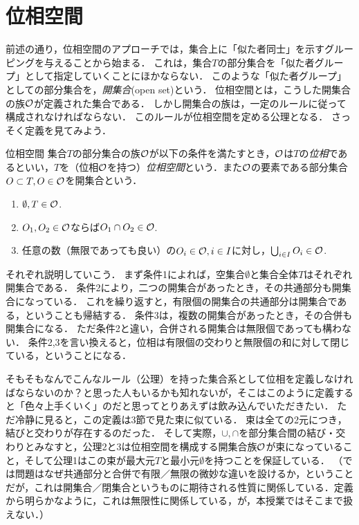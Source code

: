 \documentclass[11pt,a4paper]{jsarticle}
\begin{document}
\section{位相空間}

前述の通り，位相空間のアプローチでは，集合上に「似た者同士」を示すグルーピングを与えることから始まる．
これは，集合$T$の部分集合を「似た者グループ」として指定していくことにほかならない．
このような「似た者グループ」としての部分集合を，\emph{開集合}(open set)という．
位相空間とは，こうした開集合の族$\mathcal{O}$が定義された集合である．
しかし開集合の族は，一定のルールに従って構成されなければならない．
このルールが位相空間を定める公理となる．
さっそく定義を見てみよう．

\begin{itembox}[l]{位相空間}
集合$T$の部分集合の族$\mathcal{O}$が以下の条件を満たすとき，$\mathcal{O}$は$T$の\emph{位相}であるといい，$T$を（位相$\mathcal{O}$を持つ）\emph{位相空間}という．また$\mathcal{O}$の要素である部分集合$O \subset T, O \in \mathcal{O}$を開集合という．
\begin{enumerate}
 \item $\emptyset, T \in \mathcal{O}$.
 \item $O_1, O_2 \in \mathcal{O}$ならば$O_1 \cap O_2 \in \mathcal{O}$.
 \item 任意の数（無限であっても良い）の$O_i \in \mathcal{O}, i \in I$に対し，$\bigcup_{i \in I} O_i \in \mathcal{O}$.
\end{enumerate}
\end{itembox}

それぞれ説明していこう．
まず条件1によれば，空集合$\emptyset$と集合全体$T$はそれぞれ開集合である．
条件2により，二つの開集合があったとき，その共通部分も開集合になっている．
これを繰り返すと，有限個の開集合の共通部分は開集合である，ということも帰結する．
条件3は，複数の開集合があったとき，その合併も開集合になる．
ただ条件2と違い，合併される開集合は無限個であっても構わない．
条件2,3を言い換えると，位相は有限個の交わりと無限個の和に対して閉じている，ということになる．

そもそもなんでこんなルール（公理）を持った集合系として位相を定義しなければならないのか？と思った人もいるかも知れないが，そこはこのように定義すると「色々上手くいく」のだと思ってとりあえずは飲み込んでいただきたい．
ただ冷静に見ると，この定義は3節で見た束に似ている．
束は全ての2元につき，結びと交わりが存在するのだった．
そして実際，$\cup,\cap$を部分集合間の結び・交わりとみなすと，公理2と3は位相空間を構成する開集合族$\mathcal{O}$が束になっていること，そして公理1はこの束が最大元$T$と最小元$\emptyset$を持つことを保証している．
（では問題はなぜ共通部分と合併で有限／無限の微妙な違いを設けるか，ということだが，これは開集合／閉集合というものに期待される性質に関係している．定義から明らかなように，これは無限性に関係している，が，本授業ではそこまで扱えない．）
\end{document}
